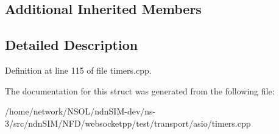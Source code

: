 \subsection*{Additional Inherited Members}


\subsection{Detailed Description}


Definition at line 115 of file timers.\+cpp.



The documentation for this struct was generated from the following file\+:\begin{DoxyCompactItemize}
\item 
/home/network/\+N\+S\+O\+L/ndn\+S\+I\+M-\/dev/ns-\/3/src/ndn\+S\+I\+M/\+N\+F\+D/websocketpp/test/transport/asio/timers.\+cpp\end{DoxyCompactItemize}
